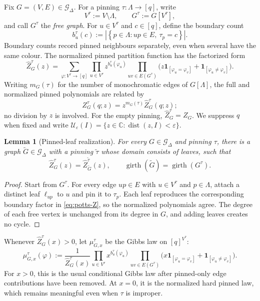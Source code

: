 \documentclass[11pt,reqno]{article}
\theoremstyle{plain}
\newtheorem{lemma}[lemma]{Lemma}
\theoremstyle{definition}
\theoremstyle{remark}
\newcommand{\C}{\mathbb{C}}
\newcommand{\eps}{\varepsilon}
\newcommand{\abs}[1]{\left|#1\right|}
\newcommand{\set}[1]{\left\{#1\right\}}
\newcommand{\dist}{\operatorname{dist}}
\newcommand{\one}[1]{\mathbf{1}_{\left[#1\right]}}   %
\newcommand{\Deg}{\Delta}                        %
\newcommand{\Zpart}{Z}                           %
\newcommand{\colours}{[q]}                        %
\newcommand{\bcount}{b}
\newcommand{\Gdeg}{\mathcal{G}_{\Deg}}
\newcommand{\Zpin}[2]{Z_{#1}^{#2}}
\newcommand{\nZpin}[2]{\widehat Z_{#1}^{#2}}
\newcommand{\mupin}[3]{\mu_{#1,#3}^{#2}}
\begin{document}
Fix \(G=(V,E)\in\Gdeg\).  For a pinning
\(\tau\colon\Lambda\to\colours\), write
\[
  V^\tau:=V\setminus\Lambda,
  \qquad
  G^\tau:=G[V^\tau],
\]
and call \(G^\tau\) the \emph{free graph}.  For \(u\in V^\tau\) and
\(c\in\colours\), define the boundary count
\begin{equation}\label{eq:pin-counts}
  \bcount_u^\tau(c)
  :=\abs{\set{p\in\Lambda:up\in E,\ \tau_p=c}}.
\end{equation}
Boundary counts record pinned neighbours separately, even when several
have the same colour.  The normalized pinned partition function has the
factorized form
\begin{equation}\label{eq:potts-Z}
  \nZpin{G}{\tau}(z)
  =\sum_{\varphi\colon V^\tau\to\colours}
     \prod_{u\in V^\tau}z^{\bcount_u^\tau(\varphi_u)}
     \prod_{uv\in E(G^\tau)}
       \bigl(z\one{\varphi_u=\varphi_v}+\one{\varphi_u\ne\varphi_v}\bigr).
\end{equation}
Writing \(m_G(\tau)\) for the number of monochromatic edges of
\(G[\Lambda]\), the full and normalized pinned polynomials are related by
\begin{equation}\label{eq:intro-normalization}
  \Zpin{G}{\tau}(q;z)
  =z^{m_G(\tau)}\nZpin{G}{\tau}(q;z);
\end{equation}
no division by \(z\) is involved.  For the empty pinning,
\(\nZpin{G}{\tau}=\Zpart_G\).  We suppress \(q\) when fixed and write
\(\mathcal U_\eps(I)=\{z\in\C:\dist(z,I)<\eps\}\).

\begin{lemma}[Pinned-leaf realization]\label{lem:pinned-leaf-realization}
For every \(G\in\Gdeg\) and pinning \(\tau\), there is a graph
\(\widetilde G\in\Gdeg\) with a pinning \(\widetilde\tau\) whose domain
consists of leaves, such that
\[
  \nZpin{G}{\tau}(z)
  =\nZpin{\widetilde G}{\widetilde\tau}(z),
  \qquad
  \operatorname{girth}(\widetilde G)
  =\operatorname{girth}(G^\tau).
\]
\end{lemma}

\begin{proof}
Start from \(G^\tau\).  For every edge \(up\in E\) with
\(u\in V^\tau\) and \(p\in\Lambda\), attach a distinct leaf
\(\ell_{up}\) to \(u\) and pin it to \(\tau_p\).  Each leaf reproduces the
corresponding boundary factor in \eqref{eq:potts-Z}, so the normalized
polynomials agree.  The degree of each free vertex is unchanged from its
degree in \(G\), and adding leaves creates no cycle.
\end{proof}

Whenever \(\nZpin{G}{\tau}(x)>0\), let \(\mupin{G}{\tau}{x}\) be the
Gibbs law on \(\colours^{V^\tau}\):
\[
  \mupin{G}{\tau}{x}(\varphi)
  :=\frac{1}{\nZpin{G}{\tau}(x)}
     \prod_{u\in V^\tau}x^{\bcount_u^\tau(\varphi_u)}
     \prod_{uv\in E(G^\tau)}
       \bigl(x\one{\varphi_u=\varphi_v}+\one{\varphi_u\ne\varphi_v}\bigr).
\]
For \(x>0\), this is the usual conditional Gibbs law after pinned-only edge
contributions have been removed.  At \(x=0\), it is the normalized hard
pinned law, which remains meaningful even when \(\tau\) is improper.
\end{document}
